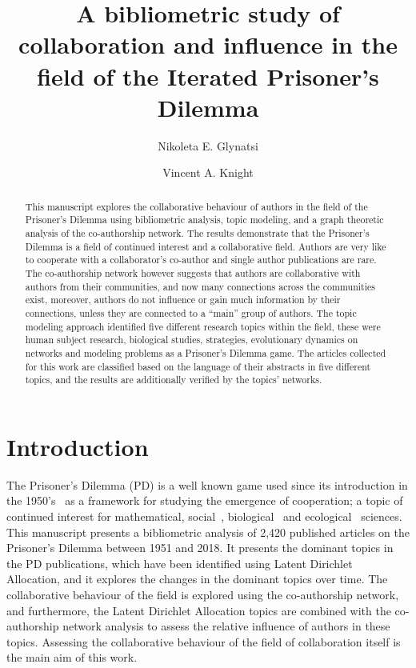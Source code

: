 \documentclass{article}
\title{A bibliometric study of collaboration and influence in the field of
the Iterated Prisoner's Dilemma}
\author[1]{Nikoleta E. Glynatsi}
\author[1]{Vincent A. Knight}
\affil[1]{Cardiff University, School of Mathematics, Cardiff, United Kingdom}
\date{}
\theoremstyle{definition}
\begin{document}
\maketitle

\begin{abstract}
This manuscript explores the collaborative behaviour of authors in the field of
the Prisoner's Dilemma using bibliometric analysis, topic modeling, and a graph
theoretic analysis of the co-authorship network. The results demonstrate that
the Prisoner's Dilemma is a field of continued interest and a collaborative
field. Authors are very like to cooperate with a collaborator's co-author and
single author publications are rare. The co-authorship network however suggests
that authors are collaborative with authors from their communities, and now many
connections across the communities exist, moreover, authors do not influence or
gain much information by their connections, unless they are connected to a
``main'' group of authors. The topic modeling approach identified five different
research topics within the field, these were human subject research, biological
studies, strategies, evolutionary dynamics on networks and modeling problems
as a Prisoner's Dilemma game.
The articles
collected for this work are classified based on the language of their
abstracts in five different topics, and the results are additionally verified by
the topics' networks.
\end{abstract}

\section{Introduction}\label{section:introduction}

The Prisoner's Dilemma (PD) is a well known game used since its introduction in
the 1950's~\cite{Flood1958} as a framework for studying the emergence of
cooperation; a topic of continued interest for mathematical,
social~\cite{Perc2008}, biological~\cite{Turner1999} and
ecological~\cite{Wu2011} sciences. This manuscript presents a bibliometric
analysis of 2,420 published articles on the Prisoner's Dilemma between 1951 and
2018. It presents the dominant topics in the PD publications, which have been
identified using Latent Dirichlet Allocation, and it explores the changes in the
dominant topics over time. The collaborative behaviour of the field is explored
using the co-authorship network, and furthermore, the Latent Dirichlet
Allocation topics are combined with the co-authorship network analysis to assess
the relative influence of authors in these topics. Assessing the collaborative
behaviour of the field of collaboration itself is the main aim of this work.
\end{document}

